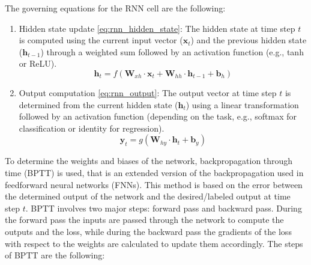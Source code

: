 The governing equations for the RNN cell are the following:
\begin{enumerate}
    \item Hidden state update \ref{eq:rnn_hidden_state}: The hidden state at time step $t$ is computed using the current input vector ($\mathbf{x}_t$) and the previous hidden state ($\mathbf{h}_{t-1}$) through a weighted sum followed by an activation function (e.g., tanh or ReLU).
    \begin{equation}
        \mathbf{h}_t = f(\mathbf{W}_{xh} \cdot \mathbf{x}_t + \mathbf{W}_{hh} \cdot \mathbf{h}_{t-1} + \mathbf{b}_h)
        \label{eq:rnn_hidden_state}
    \end{equation}
    \item Output computation \ref{eq:rnn_output}: The output vector at time step $t$ is determined from the current hidden state ($\mathbf{h}_t$) using a linear transformation followed by an activation function (depending on the task, e.g., softmax for classification or identity for regression).
    \begin{equation}
        \mathbf{y}_t = g(\mathbf{W}_{hy} \cdot \mathbf{h}_t + \mathbf{b}_y)
        \label{eq:rnn_output}
    \end{equation}
\end{enumerate}

To determine the weights and biases of the network, backpropagation through time (BPTT) is used, that is an extended version of the backpropagation used in feedforward neural networks (FNNs). This method is based on the error between the determined output of the network and the desired/labeled output at time step $t$. BPTT involves two major steps: forward pass and backward pass. During the forward pass the inputs are passed through the network to compute the outputs and the loss, while during the backward pass the gradients of the loss with respect to the weights are calculated to update them accordingly. The steps of BPTT are the following:

